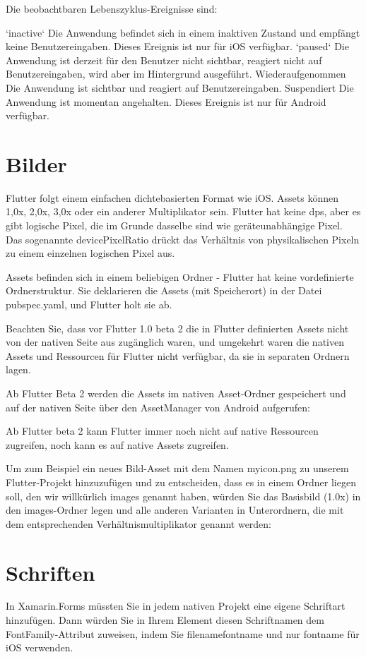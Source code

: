 Die beobachtbaren Lebenszyklus-Ereignisse sind:

`inactive`
Die Anwendung befindet sich in einem inaktiven Zustand und empfängt keine Benutzereingaben. Dieses Ereignis ist nur für iOS verfügbar.
`paused`
Die Anwendung ist derzeit für den Benutzer nicht sichtbar, reagiert nicht auf Benutzereingaben, wird aber im Hintergrund ausgeführt.
Wiederaufgenommen
Die Anwendung ist sichtbar und reagiert auf Benutzereingaben.
Suspendiert
Die Anwendung ist momentan angehalten. Dieses Ereignis ist nur für Android verfügbar.
\section{Bilder}
Flutter folgt einem einfachen dichtebasierten Format wie iOS. Assets können 1,0x, 2,0x, 3,0x oder ein anderer Multiplikator sein. Flutter hat keine dps, aber es gibt logische Pixel, die im Grunde dasselbe sind wie geräteunabhängige Pixel. Das sogenannte devicePixelRatio drückt das Verhältnis von physikalischen Pixeln zu einem einzelnen logischen Pixel aus.

Assets befinden sich in einem beliebigen Ordner - Flutter hat keine vordefinierte Ordnerstruktur. Sie deklarieren die Assets (mit Speicherort) in der Datei pubspec.yaml, und Flutter holt sie ab.

Beachten Sie, dass vor Flutter 1.0 beta 2 die in Flutter definierten Assets nicht von der nativen Seite aus zugänglich waren, und umgekehrt waren die nativen Assets und Ressourcen für Flutter nicht verfügbar, da sie in separaten Ordnern lagen.

Ab Flutter Beta 2 werden die Assets im nativen Asset-Ordner gespeichert und auf der nativen Seite über den AssetManager von Android aufgerufen:

Ab Flutter beta 2 kann Flutter immer noch nicht auf native Ressourcen zugreifen, noch kann es auf native Assets zugreifen.

Um zum Beispiel ein neues Bild-Asset mit dem Namen myicon.png zu unserem Flutter-Projekt hinzuzufügen und zu entscheiden, dass es in einem Ordner liegen soll, den wir willkürlich images genannt haben, würden Sie das Basisbild (1.0x) in den images-Ordner legen und alle anderen Varianten in Unterordnern, die mit dem entsprechenden Verhältnismultiplikator genannt werden:
\section{Schriften}
In Xamarin.Forms müssten Sie in jedem nativen Projekt eine eigene Schriftart hinzufügen. Dann würden Sie in Ihrem Element diesen Schriftnamen dem FontFamily-Attribut zuweisen, indem Sie filenamefontname und nur fontname für iOS verwenden.

